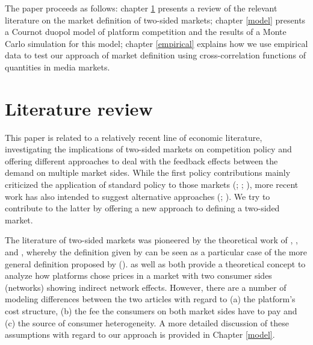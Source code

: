 \documentclass[12pt,a4paper,notitlepage]{article}
\begin{document}
The paper proceeds as follows: chapter \ref{litrev} presents a review of the relevant literature on the market definition of two-sided markets; chapter \ref{model} presents a Cournot duopol model of platform competition and the results of a Monte Carlo simulation for this model; chapter \ref{empirical}  explains how we use empirical data to test our approach of market definition using cross-correlation functions of quantities in media markets.



\section{Literature review}\label{litrev}
This paper is related to a relatively recent line of economic literature, investigating the implications of two-sided markets on competition policy and offering different approaches to deal with the feedback effects between the demand on multiple market sides. While the first policy contributions mainly criticized the application of standard policy to those markets (\citet{wright_one-sided_2004}; \citet{leonello_horizontal_2010}; \cite{chandra_mergers_2009}), more recent work has also intended to suggest alternative approaches (\citet{argentesi_estimating_2007}; \citet{song_estimating_2015}). We try to contribute to the latter by offering a new approach to defining a two-sided market. 

The literature of two-sided markets was pioneered by the theoretical work of \citet{caillaud_chicken_2003}, \citet{rochet_platform_2003}, \citet{evans_antitrust_2003} and \citet{armstrong_competition_2006}, whereby the definition given by \citet{evans_antitrust_2003} can be seen as a particular case of the more general definition proposed by \cite{rochet_platform_2003} (\citet{filistrucchi_identifying_2012}). \citet{rochet_platform_2003} as well as \citet{armstrong_competition_2006} both provide a theoretical concept to analyze how platforms chose prices in a market with two consumer sides (networks) showing indirect network effects. However, there are a number of modeling differences between the two articles with regard to (a) the platform's cost structure, (b) the fee the consumers on both market sides have to pay and (c) the source of consumer heterogeneity. A more detailed discussion of these assumptions with regard to our approach is provided in Chapter \ref{model}.  
\end{document}
